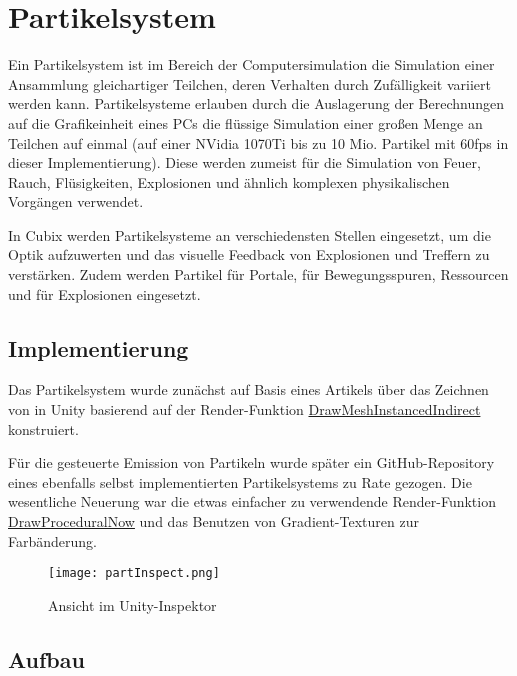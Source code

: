 \section{Partikelsystem}

Ein Partikelsystem ist im Bereich der Computersimulation die Simulation einer Ansammlung gleichartiger Teilchen, deren Verhalten durch Zufälligkeit variiert werden kann. Partikelsysteme erlauben durch die Auslagerung der Berechnungen auf die Grafikeinheit eines PCs die flüssige Simulation einer gro{\ss}en Menge an Teilchen auf einmal (auf einer NVidia 1070Ti bis zu 10 Mio. Partikel mit 60fps in dieser Implementierung). Diese werden zumeist für die Simulation von Feuer, Rauch, Flüsigkeiten, Explosionen und ähnlich komplexen physikalischen Vorgängen verwendet.

In Cubix werden Partikelsysteme an verschiedensten Stellen eingesetzt, um die Optik aufzuwerten und das visuelle Feedback von Explosionen und Treffern zu verstärken. Zudem werden Partikel für Portale, für Bewegungsspuren, Ressourcen und für Explosionen eingesetzt.



\subsection{Implementierung}

Das Partikelsystem wurde zunächst auf Basis eines Artikels über das Zeichnen von \cite{qPartS1} in Unity basierend auf der Render-Funktion \href{https://docs.unity3d.com/ScriptReference/Graphics.DrawMeshInstancedIndirect.html}{DrawMeshInstancedIndirect} konstruiert.

Für die gesteuerte Emission von Partikeln wurde später ein GitHub-Repository eines ebenfalls selbst implementierten Partikelsystems\cite{qPartS2} zu Rate gezogen. Die wesentliche Neuerung war die etwas einfacher zu verwendende Render-Funktion \href{https://docs.unity3d.com/ScriptReference/Graphics.DrawProceduralNow.html}{DrawProceduralNow} und das Benutzen von Gradient-Texturen zur Farbänderung.

\begin{figure}[H]
\centering
\texttt{[image: partInspect.png]}
\caption{Ansicht im Unity-Inspektor}
\label{img:partInspect}
\end{figure}


\subsection{Aufbau}


